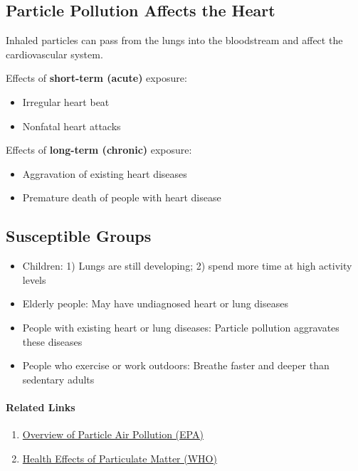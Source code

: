 \documentclass[11pt]{article}
\begin{document}
\subsection{Particle Pollution Affects the Heart}

Inhaled particles can pass from the lungs into the bloodstream and affect the cardiovascular system.

Effects of \textbf{short-term (acute)} exposure:
\begin{itemize}
    \item Irregular heart beat
    \item Nonfatal heart attacks
\end{itemize}

Effects of \textbf{long-term (chronic)} exposure:
\begin{itemize}
    \item Aggravation of existing heart diseases
    \item Premature death of people with heart disease
\end{itemize}

\subsection{Susceptible Groups}
\begin{itemize}
    \item Children: 1) Lungs are still developing; 2) spend more time at high activity levels
    \item Elderly people: May have undiagnosed heart or lung diseases
    \item People with existing heart or lung diseases: Particle pollution aggravates these diseases
    \item People who exercise or work outdoors: Breathe faster and deeper than sedentary adults
\end{itemize}

\paragraph{Related Links}

\begin{enumerate}
    \item \href{https://www.epa.gov/sites/production/files/2014-05/documents/huff-particle.pdf}{Overview of Particle Air Pollution (EPA)}
    \item \href{http://www.euro.who.int/__data/assets/pdf_file/0006/189051/Health-effects-of-particulate-matter-final-Eng.pdf}{Health Effects of Particulate Matter (WHO)}
\end{enumerate}
\end{document}
